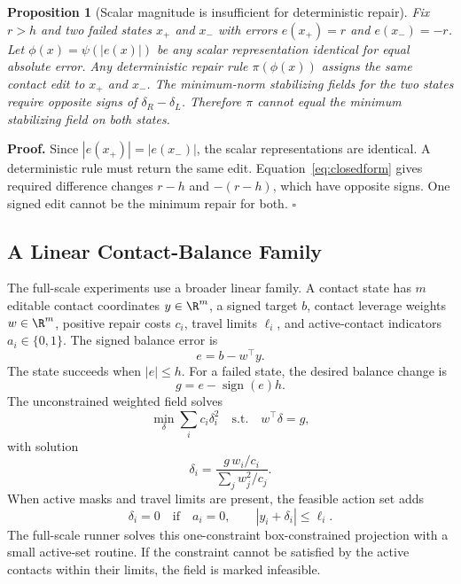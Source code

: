 \documentclass{article}
\newtheorem{proposition}{Proposition}
\newcommand{\state}{x}
\newcommand{\score}{\phi}
\begin{document}
\begin{proposition}[Scalar magnitude is insufficient for deterministic repair]
Fix $r>h$ and two failed states $\state_+$ and $\state_-$ with errors $e(\state_+)=r$ and $e(\state_-)=-r$. Let $\score(\state)=\psi(|e(\state)|)$ be any scalar representation identical for equal absolute error. Any deterministic repair rule $\pi(\score(\state))$ assigns the same contact edit to $\state_+$ and $\state_-$. The minimum-norm stabilizing fields for the two states require opposite signs of $\delta_R-\delta_L$. Therefore $\pi$ cannot equal the minimum stabilizing field on both states.
\end{proposition}

\noindent\textbf{Proof.}
Since $|e(\state_+)|=|e(\state_-)|$, the scalar representations are identical. A deterministic rule must return the same edit. Equation~\ref{eq:closedform} gives required difference changes $r-h$ and $-(r-h)$, which have opposite signs. One signed edit cannot be the minimum repair for both. \hfill $\square$

\subsection{A Linear Contact-Balance Family}

The full-scale experiments use a broader linear family. A contact state has $m$ editable contact coordinates $y\in\R^m$, a signed target $b$, contact leverage weights $w\in\R^m$, positive repair costs $c_i$, travel limits $\ell_i$, and active-contact indicators $a_i\in\{0,1\}$. The signed balance error is
\begin{equation}
    e=b-w^\top y.
\end{equation}
The state succeeds when $|e|\leq h$. For a failed state, the desired balance change is
\begin{equation}
    g=e-\operatorname{sign}(e)h.
\end{equation}
The unconstrained weighted field solves
\begin{equation}
    \min_{\delta}\sum_i c_i\delta_i^2
    \quad \mathrm{s.t.}\quad
    w^\top\delta=g,
\end{equation}
with solution
\begin{equation}
    \delta_i =
    \frac{g\,w_i/c_i}{\sum_j w_j^2/c_j}.
    \label{eq:weighted}
\end{equation}
When active masks and travel limits are present, the feasible action set adds
\begin{equation}
    \delta_i=0 \quad \mathrm{if}\quad a_i=0,
    \qquad
    |y_i+\delta_i|\leq \ell_i.
\end{equation}
The full-scale runner solves this one-constraint box-constrained projection with a small active-set routine. If the constraint cannot be satisfied by the active contacts within their limits, the field is marked infeasible.
\end{document}
